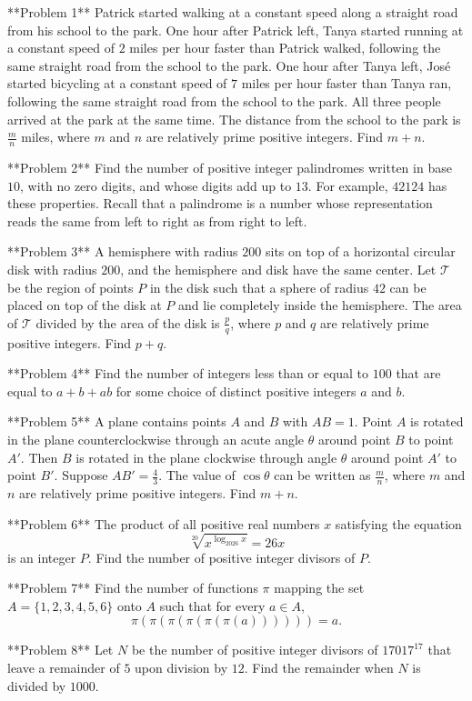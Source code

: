 **Problem 1**
Patrick started walking at a constant speed along a straight road from his school to the park. One hour after Patrick left, Tanya started running at a constant speed of $2$ miles per hour faster than Patrick walked, following the same straight road from the school to the park. One hour after Tanya left, José started bicycling at a constant speed of $7$ miles per hour faster than Tanya ran, following the same straight road from the school to the park. All three people arrived at the park at the same time. The distance from the school to the park is $\frac{m}{n}$ miles, where $m$ and $n$ are relatively prime positive integers. Find $m+n$.

**Problem 2**
Find the number of positive integer palindromes written in base $10$, with no zero digits, and whose digits add up to $13$. For example, $42124$ has these properties. Recall that a palindrome is a number whose representation reads the same from left to right as from right to left.

**Problem 3**
A hemisphere with radius $200$ sits on top of a horizontal circular disk with radius $200$, and the hemisphere and disk have the same center. Let $\mathcal{T}$ be the region of points $P$ in the disk such that a sphere of radius $42$ can be placed on top of the disk at $P$ and lie completely inside the hemisphere. The area of $\mathcal{T}$ divided by the area of the disk is $\frac{p}{q}$, where $p$ and $q$ are relatively prime positive integers. Find $p+q$.

**Problem 4**
Find the number of integers less than or equal to $100$ that are equal to $a+b+ab$ for some choice of distinct positive integers $a$ and $b$.

**Problem 5**
A plane contains points $A$ and $B$ with $AB = 1$. Point $A$ is rotated in the plane counterclockwise through an acute angle $\theta$ around point $B$ to point $A'$. Then $B$ is rotated in the plane clockwise through angle $\theta$ around point $A'$ to point $B'$. Suppose $AB' = \frac{4}{3}$. The value of $\cos \theta$ can be written as $\frac{m}{n}$, where $m$ and $n$ are relatively prime positive integers. Find $m+n$.

**Problem 6**
The product of all positive real numbers $x$ satisfying the equation$$\sqrt[20]{x^{\log_{2026} x}} = 26x$$is an integer $P$. Find the number of positive integer divisors of $P$.

**Problem 7**
Find the number of functions $\pi$ mapping the set $A = \{1, 2, 3, 4, 5, 6\}$ onto $A$ such that for every $a \in A$,$$\pi(\pi(\pi(\pi(\pi(\pi(a)))))) = a.$$

**Problem 8**
Let $N$ be the number of positive integer divisors of $17017^{17}$ that leave a remainder of $5$ upon division by $12$. Find the remainder when $N$ is divided by $1000$.
